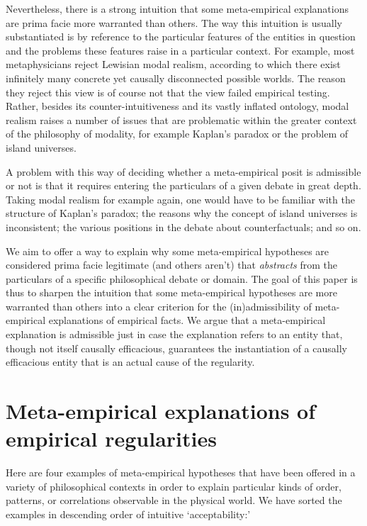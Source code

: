 \documentclass[a4paper,12pt]{article}
\begin{document}
Nevertheless, there is a strong intuition that some meta-empirical explanations are prima facie more warranted than others. The way this intuition is usually substantiated is by reference to the particular features of the entities in question and the problems these features raise in a particular context. For example, most metaphysicians reject Lewisian modal realism, according to which there exist infinitely many concrete yet causally disconnected possible worlds. The reason they reject this view is of course not that the view failed empirical testing. Rather, besides its counter-intuitiveness and its vastly inflated ontology, modal realism raises a number of issues that are problematic within the greater context of the philosophy of modality, for example Kaplan's paradox or the problem of island universes.

A problem with this way of deciding whether a meta-empirical posit is admissible or not is that it requires entering the particulars of a given debate in great depth. Taking modal realism for example again, one would have to be familiar with the structure of Kaplan's paradox; the reasons why the concept of island universes is inconsistent; the various positions in the debate about counterfactuals; and so on.

We aim to offer a way to explain why some meta-empirical hypotheses are considered prima facie legitimate (and others aren't) that \textit{abstracts} from the particulars of a specific philosophical debate or domain. The goal of this paper is thus to sharpen the intuition that some meta-empirical hypotheses are more warranted than others into a clear criterion for the (in)admissibility of meta-empirical explanations of empirical facts. We argue that a meta-empirical explanation is admissible just in case the explanation refers to an entity that, though not itself causally efficacious, guarantees the instantiation of a causally efficacious entity that is an actual cause of the regularity.

\section{Meta-empirical explanations of empirical regularities}

Here are four examples of meta-empirical hypotheses that have been offered in a variety of philosophical contexts in order to explain particular kinds of order, patterns, or correlations observable in the physical world. We have sorted the examples in descending order of intuitive `acceptability:'
\end{document}
